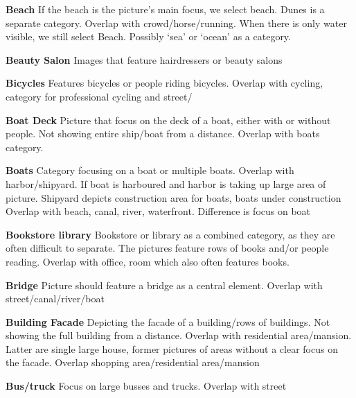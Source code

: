 
\noindent\textbf{Beach}
If the beach is the picture's main focus, we select beach. Dunes is a separate category. Overlap with crowd/horse/running. When there is only water visible, we still select Beach. Possibly `sea' or `ocean' as a category.


\noindent\textbf{Beauty Salon}
Images that feature hairdressers or beauty salons

\noindent\textbf{Bicycles}
Features bicycles or people riding bicycles. Overlap with cycling, category for professional cycling and street/

\noindent\textbf{Boat Deck}
Picture that focus on the deck of a boat, either with or without people. Not showing entire ship/boat from a distance. Overlap with boats category.

\noindent\textbf{Boats}
Category focusing on a boat or multiple boats.
Overlap with harbor/shipyard. If boat is harboured and harbor is taking up large area of picture. Shipyard depicts construction area for boats, boats under construction
Overlap with beach, canal, river, waterfront. Difference is focus on boat

\noindent\textbf{Bookstore library}
Bookstore or library as a combined category, as they are often difficult to separate. The pictures feature rows of books and/or people reading.
Overlap with office, room which also often features books.

%

\noindent\textbf{Bridge}
Picture should feature a bridge as a central element. Overlap with street/canal/river/boat

\noindent\textbf{Building Facade}
Depicting the facade of a building/rows of buildings. Not showing the full building from a distance. Overlap with residential area/mansion. Latter are single large house, former pictures of areas without a clear focus on the facade. Overlap shopping area/residential area/mansion

%

\noindent\textbf{Bus/truck}
Focus on large busses and trucks. Overlap with street

